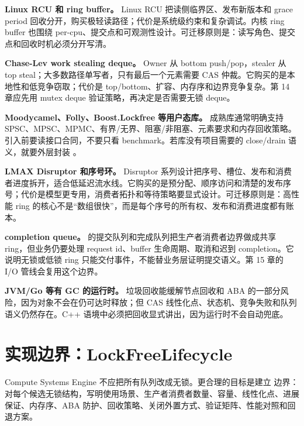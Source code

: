 \begin{casebox}
\textbf{Linux RCU 和 ring buffer。}
Linux RCU 把读侧临界区、发布新版本和 grace period 回收分开，购买极轻读路径；代价是系统级约束和复杂调试。内核 ring buffer 也围绕 per-cpu、提交点和可观测性设计。可迁移原则是：读写角色、提交点和回收时机必须分开写清。

\textbf{Chase-Lev work stealing deque。}
Owner 从 bottom push/pop，stealer 从 top steal；大多数路径单写者，只有最后一个元素需要 CAS 仲裁。它购买的是本地性和低竞争窃取；代价是 top/bottom、扩容、内存序和边界竞争复杂。第 14 章应先用 mutex deque 验证策略，再决定是否需要无锁 deque。

\textbf{Moodycamel、Folly、Boost.Lockfree 等用户态库。}
成熟库通常明确支持 SPSC、MPSC、MPMC、有界/无界、阻塞/非阻塞、元素要求和内存回收策略。引入前要读接口合同，不要只看 benchmark。若库没有项目需要的 close/drain 语义，就要外层封装 。

\textbf{LMAX Disruptor 和序号环。}
Disruptor 系列设计把序号、槽位、发布和消费者进度拆开，适合低延迟流水线。它购买的是预分配、顺序访问和清楚的发布序号；代价是模型更专用，消费者拓扑和等待策略要显式设计。可迁移原则是：高性能 ring 的核心不是“数组很快”，而是每个序号的所有权、发布和消费进度都有账本。

\textbf{ completion queue。}
 的提交队列和完成队列把生产者消费者边界做成共享 ring，但业务仍要处理 request id、buffer 生命周期、取消和迟到 completion。它说明无锁或低锁 ring 只能交付事件，不能替业务层证明提交语义。第 15 章的 I/O 管线会复用这个边界。

\textbf{JVM/Go 等有 GC 的运行时。}
垃圾回收能缓解节点回收和 ABA 的一部分风险，因为对象不会在仍可达时释放；但 CAS 线性化点、状态机、竞争失败和队列语义仍然存在。C++ 语境中必须把回收显式讲出，因为运行时不会自动兜底。
\end{casebox}

\section{实现边界：LockFreeLifecycle}

Compute Systems Engine 不应把所有队列改成无锁。更合理的目标是建立  边界：对每个候选无锁结构，写明使用场景、生产者消费者数量、容量、线性化点、进展保证、内存序、ABA 防护、回收策略、关闭外置方式、验证矩阵、性能对照和回退方案。

